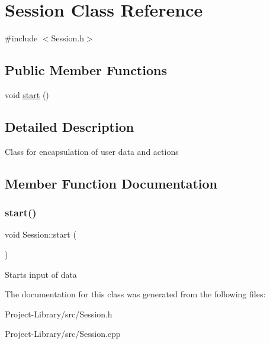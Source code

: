 \hypertarget{classSession}{}\section{Session Class Reference}
\label{classSession}


{\ttfamily \#include $<$Session.\+h$>$}

\subsection*{Public Member Functions}
\begin{DoxyCompactItemize}
\item 
void \hyperlink{classSession_a47baf956cead0046fcbac45c572c70d3}{start} ()
\end{DoxyCompactItemize}


\subsection{Detailed Description}
Class for encapsulation of user data and actions 

\subsection{Member Function Documentation}
\mbox{\label{classSession_a47baf956cead0046fcbac45c572c70d3}} 
\subsubsection{\texorpdfstring{start()}{start()}}
{\footnotesize\ttfamily void Session\+::start (\begin{DoxyParamCaption}{ }\end{DoxyParamCaption})}

Starts input of data 

The documentation for this class was generated from the following files\+:\begin{DoxyCompactItemize}
\item 
Project-\/\+Library/src/Session.\+h\item 
Project-\/\+Library/src/Session.\+cpp\end{DoxyCompactItemize}

